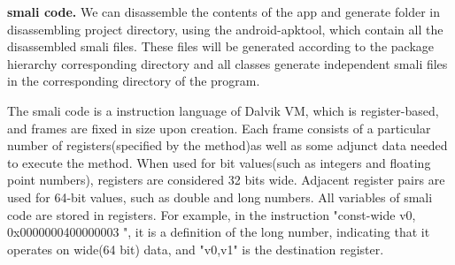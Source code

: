 \textbf{smali code.} We can disassemble the contents of the app and generate folder in disassembling project directory, using the android-apktool, which contain all the disassembled smali\cite{03} files. These files will be generated according to the package hierarchy corresponding directory and all classes generate independent smali files in the corresponding directory of the program\cite{20}.

The smali code is a instruction language of Dalvik VM, which is register-based, and frames are fixed in size upon creation. Each frame consists of a particular number of registers(specified by the method)as well as some adjunct data needed to execute the method. When used for bit values(such as integers and floating point numbers), registers are considered 32 bits wide. Adjacent register pairs are used for 64-bit values, such as double and long numbers. All variables of smali code are stored in registers. For example, in the instruction "const-wide v0, 0x0000000400000003 ", it is a definition of the long number, indicating that it operates on wide(64 bit) data, and "v0,v1" is the destination register.
